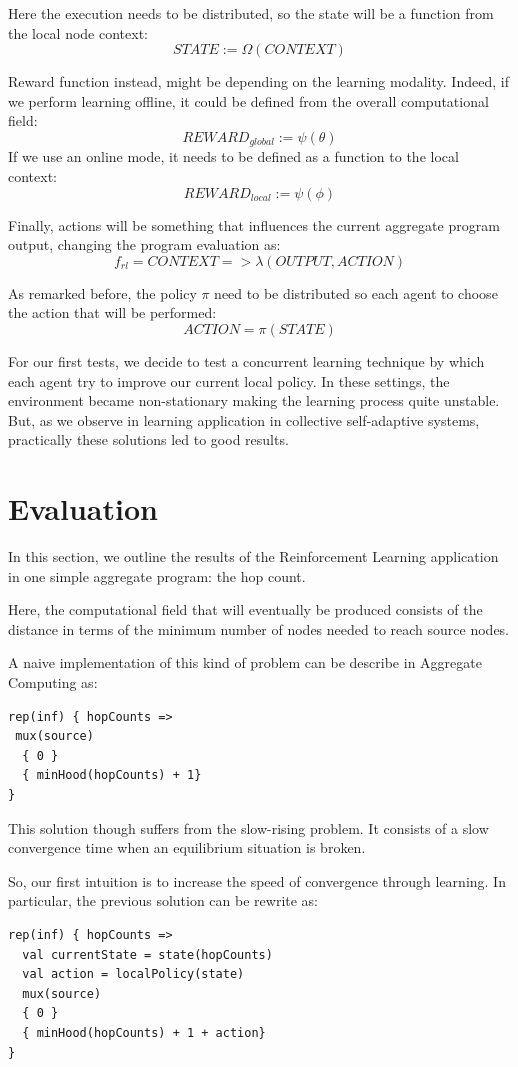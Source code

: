 \documentclass[
  twocolumn,
]{ceurart}
\begin{document}
Here the execution needs to be distributed, so the state will be a function from the local node context:
$$
STATE := \Omega(CONTEXT)
$$

Reward function instead, might be depending on the learning modality. Indeed, if we perform learning offline, 
it could be defined from the overall computational field:
$$
REWARD_{global} := \psi({\theta})
$$
If we use an online mode, it needs to be defined as a function to the local context:
$$
REWARD_{local} := \psi(\phi)
$$

Finally, actions will be something that influences the current aggregate program output, changing the program evaluation as:
$$
f_{rl} = CONTEXT => \lambda(OUTPUT, ACTION)
$$

As remarked before, the policy $\pi$ need to be distributed so each agent to choose the action that will be performed:
$$
ACTION = \pi(STATE)
$$

For our first tests, we decide to test a concurrent learning technique by which each agent try to improve our current local policy.
In these settings, the environment became non-stationary making the learning process quite unstable.
But, as we observe in learning application in collective self-adaptive systems, practically these solutions led to good results.


\section{Evaluation} %
In this section, we outline the results of the Reinforcement Learning application in one simple
 aggregate program: the hop count.

Here, the computational field that will eventually be produced consists of the distance in terms of the minimum number of nodes needed to reach source nodes.

A naive implementation of this kind of problem can be describe in Aggregate Computing as:
\begin{verbatim}
rep(inf) { hopCounts => 
 mux(source) 
  { 0 } 
  { minHood(hopCounts) + 1} 
}
\end{verbatim}
This solution though suffers from the slow-rising problem. It consists of a slow convergence time when an equilibrium situation is broken. 

So, our first intuition is to increase the speed of convergence through learning. In particular, the previous solution can be rewrite as:

 \begin{verbatim}
rep(inf) { hopCounts => 
  val currentState = state(hopCounts)
  val action = localPolicy(state)
  mux(source) 
  { 0 } 
  { minHood(hopCounts) + 1 + action} 
}
\end{verbatim}
\end{document}
